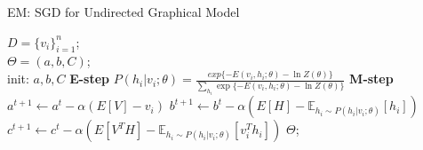 \documentclass[UTF8]{ctexart}
\numberwithin{equation}{section}
\begin{document}
\begin{algorithm}[htb]
    \caption{EM: SGD for Undirected Graphical Model}
    \label{alg:A10_2}
    \begin{algorithmic}[1]
    \REQUIRE
    $D=\{v_i\}_{i=1}^n$;\\
    \ENSURE 
    $\Theta=(a,b,C)$; \\
    \STATE init: $a,b,C$
    \REPEAT 
    \STATE \textbf{E-step}
    \STATE \quad \quad $P(h_i | v_i; \theta) = \frac{exp\{-E(v_i,h_i;\theta) -\ln Z(\theta) \}}{\sum_{h_i}\exp\{-E(v_i,h_i;\theta) -\ln Z(\theta) \}}$
    \STATE \textbf{M-step}
    \STATE \quad \quad $a^{t+1} \leftarrow a^t - \alpha(E[V]-v_i)$
    \STATE \quad \quad $b^{t+1} \leftarrow b^t - \alpha(E[H]-\mathbb{E}_{h_i\sim P(h_i|v_i;\theta)}[h_i])$
    \STATE \quad \quad $c^{t+1} \leftarrow c^t - \alpha(E[V^T H] - \mathbb{E}_{h_i\sim P(h_i|v_i;\theta)}[v_i^Th_i])$
    \UNTIL 
    \RETURN $\Theta$;
    \end{algorithmic}
\end{algorithm}
\end{document}
